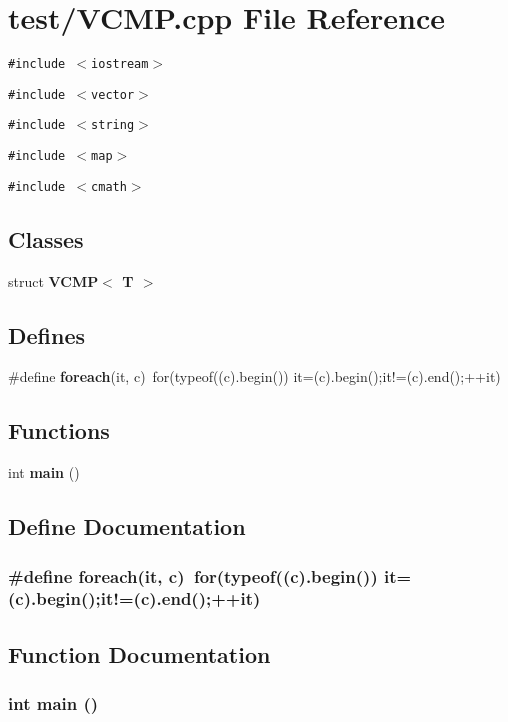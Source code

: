 \section{test/VCMP.cpp File Reference}
\label{VCMP_8cpp}
{\tt \#include $<$iostream$>$}\par
{\tt \#include $<$vector$>$}\par
{\tt \#include $<$string$>$}\par
{\tt \#include $<$map$>$}\par
{\tt \#include $<$cmath$>$}\par
\subsection*{Classes}
\begin{CompactItemize}
\item 
struct {\bf VCMP$<$ T $>$}
\end{CompactItemize}
\subsection*{Defines}
\begin{CompactItemize}
\item 
\#define {\bf foreach}(it, c)~for(typeof((c).begin()) it=(c).begin();it!=(c).end();++it)
\end{CompactItemize}
\subsection*{Functions}
\begin{CompactItemize}
\item 
int {\bf main} ()
\end{CompactItemize}


\subsection{Define Documentation}
\subsubsection{\setlength{\rightskip}{0pt plus 5cm}\#define foreach(it, c)~for(typeof((c).begin()) it=(c).begin();it!=(c).end();++it)}\label{VCMP_8cpp_35602f6dd088ffe8623bee13c68f7ab3}




\subsection{Function Documentation}
\subsubsection{\setlength{\rightskip}{0pt plus 5cm}int main ()}\label{VCMP_8cpp_446c6b9a1a4dbab517fbb760870458a3}


